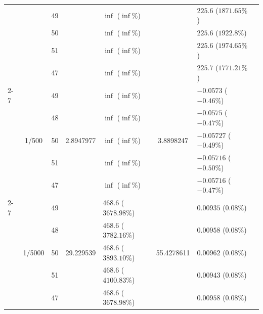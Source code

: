 \begin{table}[htbp]
{\begin{tabular}{lclclclc}
    &                        & 49 &                          & $\inf$ ($\inf\%$)    &                          & $225.6$ ($1871.65\%$)     \\
    &                        & 50 &                          & $\inf$ ($\inf\%$)    &                          & $225.6$ ($1922.8\%$)      \\
    &                        & 51 &                          & $\inf$ ($\inf\%$)    &                          & $225.6$ ($1974.65\%$)     \\
    &                        & 47 &                          & $\inf$ ($\inf\%$)    &                          & $225.7$ ($1771.21\%$)     \\
    \cmidrule(lr){2-7}
    & \multirow{5}{*}{1/500} & 49 & \multirow{5}{*}{2.8947977} & $\inf$ ($\inf\%$)    & \multirow{5}{*}{3.8898247} & $-0.0573$ ($-0.46\%$)     \\
    &                        & 48 &                          & $\inf$ ($\inf\%$)    &                          & $-0.0575$ ($-0.47\%$)     \\
    &                        & 50 &                          & $\inf$ ($\inf\%$)    &                          & $-0.05727$ ($-0.49\%$)    \\
    &                        & 51 &                          & $\inf$ ($\inf\%$)    &                          & $-0.05716$ ($-0.50\%$)    \\
    &                        & 47 &                          & $\inf$ ($\inf\%$)    &                          & $-0.05716$ ($-0.47\%$)    \\
    \cmidrule(lr){2-7}
    & \multirow{5}{*}{1/5000}& 49 & \multirow{5}{*}{29.229539} & $468.6$ ($3678.98\%$)   & \multirow{5}{*}{55.4278611} & $0.00935$ ($0.08\%$)      \\
    &                         & 48 &                          & $468.6$ ($3782.16\%$)   &                          & $0.00958$ ($0.08\%$)      \\
    &                         & 50 &                          & $468.6$ ($3893.10\%$)   &                          & $0.00962$ ($0.08\%$)      \\
    &                         & 51 &                          & $468.6$ ($4100.83\%$)   &                          & $0.00943$ ($0.08\%$)      \\
    &                         & 47 &                          & $468.6$ ($3678.98\%$)   &                          & $0.00958$ ($0.08\%$)      \\

\end{tabular}}
\end{table}
